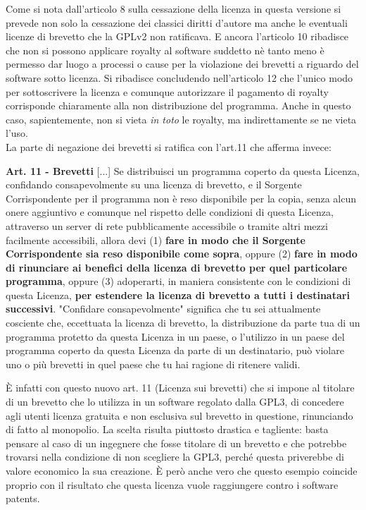 Come si nota dall'articolo 8 sulla cessazione della licenza in questa versione si prevede non solo la cessazione dei classici diritti d'autore ma anche le eventuali licenze di brevetto che la GPLv2 non ratificava. E ancora l'articolo 10 ribadisce che non si possono applicare royalty al software suddetto nè tanto meno è permesso dar luogo a processi o cause per la violazione dei brevetti a riguardo del software sotto licenza. Si ribadisce concludendo nell'articolo 12 che l'unico modo per sottoscrivere la licenza e comunque autorizzare il pagamento di royalty corrisponde chiaramente alla non distribuzione del programma. Anche in questo caso, sapientemente, non si vieta \textit{in toto} le royalty, ma indirettamente se ne vieta l'uso.\\

La parte di negazione dei brevetti si ratifica con l'art.11 che afferma invece:\\

\begin{scriptsize}

\textbf{Art. 11 -  Brevetti}
[...]
Se distribuisci un programma coperto da questa Licenza, confidando consapevolmente su una licenza di brevetto, e il Sorgente Corrispondente per il programma non è reso disponibile per la copia, senza alcun onere aggiuntivo e comunque nel rispetto delle condizioni di questa Licenza, attraverso un server di rete pubblicamente accessibile o tramite altri mezzi facilmente accessibili, allora devi (1) \textbf{fare in modo che il Sorgente Corrispondente sia reso disponibile come sopra}, oppure (2) \textbf{fare in modo di rinunciare ai benefici della licenza di brevetto per quel particolare programma}, oppure (3) adoperarti, in maniera consistente con le condizioni di questa Licenza, \textbf{per estendere la licenza di brevetto a tutti i destinatari successivi}. "Confidare consapevolmente" significa che tu sei attualmente cosciente che, eccettuata la licenza di brevetto, la distribuzione da parte tua di un programma protetto da questa Licenza in un paese, o l'utilizzo in un paese del programma coperto da questa Licenza da parte di un destinatario, può violare uno o più brevetti in quel paese che tu hai ragione di ritenere validi.\\

\end{scriptsize}


\`E infatti con questo nuovo art. 11 (Licenza sui brevetti) che si impone al titolare di un brevetto che lo utilizza in un software regolato dalla GPL3, di concedere agli utenti licenza gratuita e non esclusiva sul brevetto in questione, rinunciando di fatto al monopolio. La scelta risulta piuttosto drastica e tagliente: basta pensare al caso di un ingegnere che fosse titolare di un brevetto e che potrebbe trovarsi nella condizione di non scegliere la GPL3, perché questa priverebbe di valore economico la sua creazione. \`E però anche vero che questo esempio coincide proprio con il risultato che questa licenza vuole raggiungere contro i software patents.



